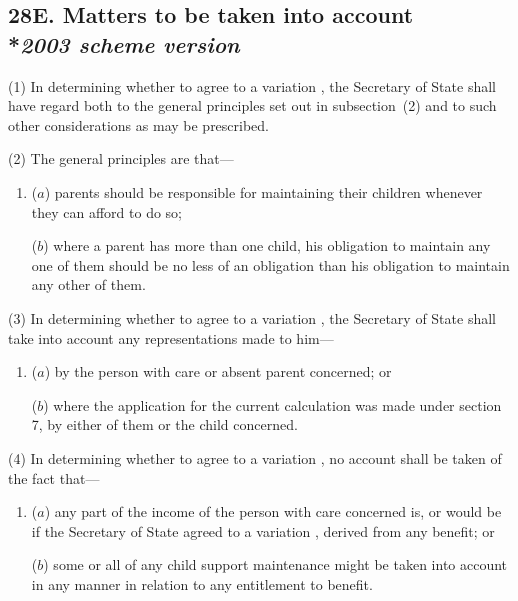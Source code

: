 \documentclass[12pt,a4paper]{article}
\begin{document}
\subsection[28E. Matters to be taken into account --- \emph{2003 scheme version}]{28E. Matters to be taken into account\\*\emph{2003 scheme version}}

(1) In determining 
whether to agree to a variation%
, the Secretary of State shall have regard both to the general principles set out in subsection~(2) and to such other considerations as may be prescribed.

(2) The general principles are that—
\begin{enumerate}\item[]
($a$) parents should be responsible for maintaining their children whenever they can afford to do so;

($b$) where a parent has more than one child, his obligation to maintain any one of them should be no less of an obligation than his obligation to maintain any other of them.
\end{enumerate}

(3) In determining 
whether to agree to a variation%
, the Secretary of State shall take into account any representations made to him—
\begin{enumerate}\item[]
($a$) by the person with care or absent parent concerned; or

($b$) where the application for the current 
calculation  %
was made under section 7, by either of them or the child concerned.
\end{enumerate}

(4) In determining 
whether to agree to a variation%
, no account shall be taken of the fact that—
\begin{enumerate}\item[]
($a$) any part of the income of the person with care concerned is, or would be if 
the Secretary of State agreed to a variation%
, derived from any benefit; or

($b$) some or all of any child support maintenance might be taken into account in any manner in relation to any entitlement to benefit.
\end{enumerate}
\end{document}
